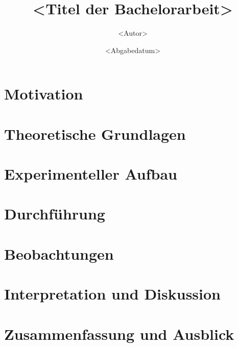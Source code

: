 \documentclass[12pt,a4paper]{scrartcl}
\title{<Titel der Bachelorarbeit>}
\author{<Autor>}
\date{<Abgabedatum>}
\begin{document}
\maketitle

\begin{abstract}

\end{abstract}

\tableofcontents
\newpage

\section{Motivation}


\section{Theoretische Grundlagen}


\section{Experimenteller Aufbau}


\section{Durchführung}


\section{Beobachtungen}


\section{Interpretation und Diskussion}


\section{Zusammenfassung und Ausblick}


\printglossaries %

\end{document}
